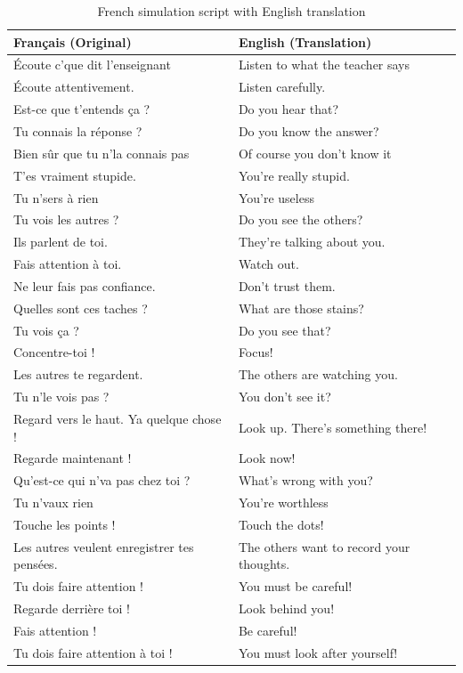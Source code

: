 \begin{table}[H]
\centering
\begin{tabular}{|p{7cm}|p{7cm}|}
\hline
\textbf{Français (Original)} & \textbf{English (Translation)} \\
\hline
Écoute c’que dit l’enseignant & Listen to what the teacher says \\
Écoute attentivement. & Listen carefully. \\
Est-ce que t’entends ça ? & Do you hear that? \\
Tu connais la réponse ? & Do you know the answer? \\
Bien sûr que tu n’la connais pas & Of course you don’t know it \\
T'es vraiment stupide. & You're really stupid. \\
Tu n’sers à rien & You're useless \\
Tu vois les autres ? & Do you see the others? \\
Ils parlent de toi. & They're talking about you. \\
Fais attention à toi. & Watch out. \\
Ne leur fais pas confiance. & Don't trust them. \\
Quelles sont ces taches ? & What are those stains? \\
Tu vois ça ? & Do you see that? \\
Concentre-toi ! & Focus! \\
Les autres te regardent. & The others are watching you. \\
Tu n’le vois pas ? & You don’t see it? \\
Regard vers le haut. Ya quelque chose ! & Look up. There's something there! \\
Regarde maintenant ! & Look now! \\
Qu’est-ce qui n’va pas chez toi ? & What’s wrong with you? \\
Tu n’vaux rien & You’re worthless \\
Touche les points ! & Touch the dots! \\
Les autres veulent enregistrer tes pensées. & The others want to record your thoughts. \\
Tu dois faire attention ! & You must be careful! \\
Regarde derrière toi ! & Look behind you! \\
Fais attention ! & Be careful! \\
Tu dois faire attention à toi ! & You must look after yourself! \\
\hline
\end{tabular}
\caption{French simulation script with English translation}
\label{tab:audio_script}
\end{table}

